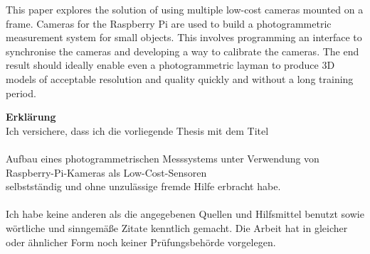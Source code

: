 \documentclass[a4paper,12pt,bibliography=totoc, listof=totoc, titlepage]{scrreprt}
\begin{document}
This paper explores the solution of using multiple low-cost cameras mounted on a frame. Cameras for the Raspberry Pi are used to build a photogrammetric measurement system for small objects. This involves programming an interface to synchronise the cameras and developing a way to calibrate the cameras. The end result should ideally enable even a photogrammetric layman to produce 3D models of acceptable resolution and quality quickly and without a long training period.

\newpage

\tableofcontents
\newpage

\setcounter{page}{1}

















\clearpage


\clearpage
\renewcommand\UrlFont\itshape
\renewcommand{\refname}{Literaturverzeichnis}

\listoffigures
\listoftables


\renewcommand{\appendixpagename}{\appendixname}
\renewcommand{\appendixtocname}{\appendixname}
\begin{appendices}
    
    
\end{appendices}

\clearpage
\thispagestyle{empty}
\noindent\textbf{\large Erklärung}\\
Ich versichere, dass ich die vorliegende Thesis mit dem Titel\\
\\
Aufbau eines photogrammetrischen Messsystems unter Verwendung von Raspberry-Pi-Kameras als Low-Cost-Sensoren
\\
selbstständig und ohne unzulässige fremde Hilfe erbracht habe.\\
\\
Ich habe keine anderen als die angegebenen Quellen und Hilfsmittel benutzt sowie wörtliche und
sinngemäße Zitate kenntlich gemacht. Die Arbeit hat in gleicher oder ähnlicher Form
noch keiner Prüfungsbehörde vorgelegen.
\\
\\
\\
\\
\end{document}
